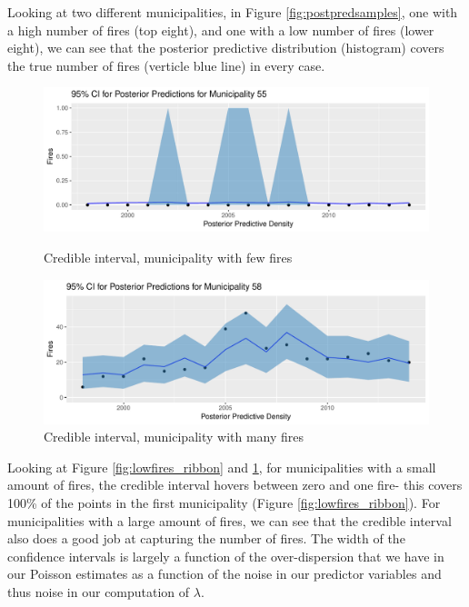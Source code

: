 \documentclass[10pt,a4paper, hidelinks]{article} %
\begin{document}
Looking at two different municipalities, in Figure \ref{fig:postpredsamples}, one with a high number of fires (top eight), and one with a low number of fires (lower eight), we can see that the posterior predictive distribution (histogram) covers the true number of fires (verticle blue line) in every case.

\begin{figure}[H]
	\centering	\begin{minipage}[c]{0.6\textwidth}
		\includegraphics[width=\textwidth]{../fig/post_pred_samples_ribbon_low}
	\end{minipage} \hfill
	\begin{minipage}[c]{0.39\textwidth}
		\caption{Credible interval, municipality with few fires}
		\label{fig:lowfires_ribbon}
	\end{minipage}
	\centering	\begin{minipage}[c]{0.6\textwidth}
	\includegraphics[width=\textwidth]{../fig/post_pred_samples_ribbon_high}
\end{minipage} \hfill
\begin{minipage}[c]{0.39\textwidth}
	\caption{Credible interval, municipality with many fires}
		\label{fig:highfires_ribbon}
\end{minipage}
\end{figure}

	Looking at Figure \ref{fig:lowfires_ribbon} and \ref{fig:highfires_ribbon}, for municipalities with a small amount of fires, the credible interval hovers between zero and one fire- this covers 100\% of the points in the first municipality (Figure \ref{fig:lowfires_ribbon}).  For municipalities with a large amount of fires, we can see that the credible interval also does a good job at capturing the number of fires. The width of the confidence intervals is largely a function of the over-dispersion that we have in our Poisson estimates as a function of the noise in our predictor variables and thus noise in our computation of $\lambda$.
\end{document}
